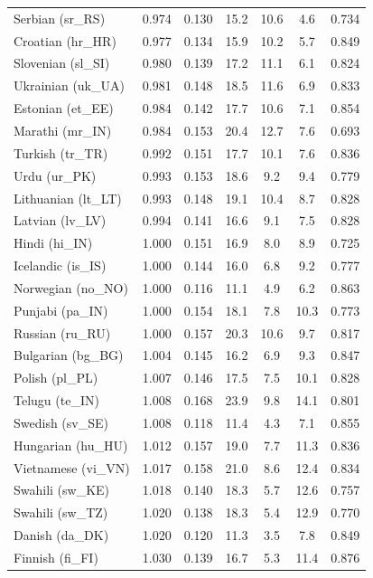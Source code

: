 \begin{longtable}{@{}lcccccc@{}}
    Serbian (sr\_RS) & 0.974 & 0.130 & 15.2 & 10.6 & 4.6 & 0.734 \\
    Croatian (hr\_HR) & 0.977 & 0.134 & 15.9 & 10.2 & 5.7 & 0.849 \\
    Slovenian (sl\_SI) & 0.980 & 0.139 & 17.2 & 11.1 & 6.1 & 0.824 \\
    Ukrainian (uk\_UA) & 0.981 & 0.148 & 18.5 & 11.6 & 6.9 & 0.833 \\
    Estonian (et\_EE) & 0.984 & 0.142 & 17.7 & 10.6 & 7.1 & 0.854 \\
    Marathi (mr\_IN) & 0.984 & 0.153 & 20.4 & 12.7 & 7.6 & 0.693 \\
    Turkish (tr\_TR) & 0.992 & 0.151 & 17.7 & 10.1 & 7.6 & 0.836 \\
    Urdu (ur\_PK) & 0.993 & 0.153 & 18.6 & 9.2 & 9.4 & 0.779 \\
    Lithuanian (lt\_LT) & 0.993 & 0.148 & 19.1 & 10.4 & 8.7 & 0.828 \\
    Latvian (lv\_LV) & 0.994 & 0.141 & 16.6 & 9.1 & 7.5 & 0.828 \\
    Hindi (hi\_IN) & 1.000 & 0.151 & 16.9 & 8.0 & 8.9 & 0.725 \\
    Icelandic (is\_IS) & 1.000 & 0.144 & 16.0 & 6.8 & 9.2 & 0.777 \\
    Norwegian (no\_NO) & 1.000 & 0.116 & 11.1 & 4.9 & 6.2 & 0.863 \\
    Punjabi (pa\_IN) & 1.000 & 0.154 & 18.1 & 7.8 & 10.3 & 0.773 \\
    Russian (ru\_RU) & 1.000 & 0.157 & 20.3 & 10.6 & 9.7 & 0.817 \\
    Bulgarian (bg\_BG) & 1.004 & 0.145 & 16.2 & 6.9 & 9.3 & 0.847 \\
    Polish (pl\_PL) & 1.007 & 0.146 & 17.5 & 7.5 & 10.1 & 0.828 \\
    Telugu (te\_IN) & 1.008 & 0.168 & 23.9 & 9.8 & 14.1 & 0.801 \\
    Swedish (sv\_SE) & 1.008 & 0.118 & 11.4 & 4.3 & 7.1 & 0.855 \\
    Hungarian (hu\_HU) & 1.012 & 0.157 & 19.0 & 7.7 & 11.3 & 0.836 \\
    Vietnamese (vi\_VN) & 1.017 & 0.158 & 21.0 & 8.6 & 12.4 & 0.834 \\
    Swahili (sw\_KE) & 1.018 & 0.140 & 18.3 & 5.7 & 12.6 & 0.757 \\
    Swahili (sw\_TZ) & 1.020 & 0.138 & 18.3 & 5.4 & 12.9 & 0.770 \\
    Danish (da\_DK) & 1.020 & 0.120 & 11.3 & 3.5 & 7.8 & 0.849 \\
    Finnish (fi\_FI) & 1.030 & 0.139 & 16.7 & 5.3 & 11.4 & 0.876 \\

\end{longtable}
